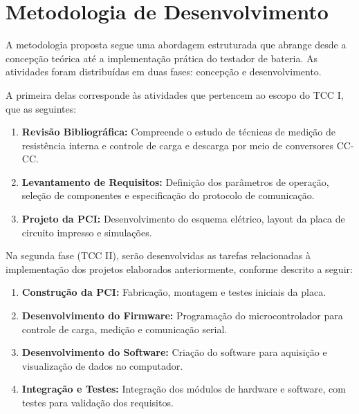 \chapter{Metodologia de Desenvolvimento} \label{cha:metodologia}

A metodologia proposta segue uma abordagem estruturada que abrange desde a
concepção teórica até a implementação prática do testador de bateria. As
atividades foram distribuídas em duas fases: concepção e desenvolvimento.

A primeira delas corresponde às atividades que pertencem ao escopo do TCC I,
que as seguintes:

\begin{enumerate}
    \item \textbf{Revisão Bibliográfica:} Compreende o estudo de técnicas de
        medição de resistência interna e controle de carga e descarga por meio
        de conversores CC-CC.
    \item \textbf{Levantamento de Requisitos:} Definição dos parâmetros de
        operação, seleção de componentes e especificação do protocolo de comunicação.
    \item \textbf{Projeto da PCI:} Desenvolvimento do esquema elétrico, layout
        da placa de circuito impresso e simulações.
\end{enumerate}

Na segunda fase (TCC II), serão desenvolvidas as tarefas relacionadas à implementação dos
projetos elaborados anteriormente, conforme descrito a seguir:

\begin{enumerate}
    \item \textbf{Construção da PCI:} Fabricação, montagem e testes iniciais da placa.
    \item \textbf{Desenvolvimento do Firmware:} Programação do microcontrolador para
        controle de carga, medição e comunicação serial.
    \item \textbf{Desenvolvimento do Software:} Criação do software para aquisição e
        visualização de dados no computador.
    \item \textbf{Integração e Testes:} Integração dos módulos de hardware e software,
        com testes para validação dos requisitos.
\end{enumerate}